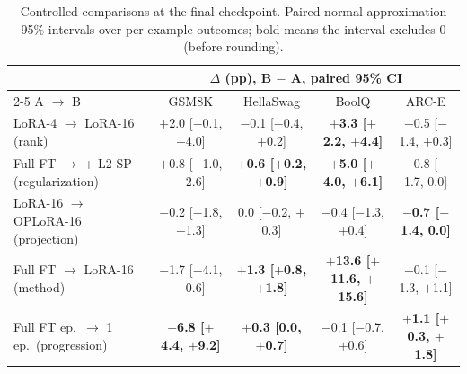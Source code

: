 \begin{table}[t]
\centering
\footnotesize
\setlength{\tabcolsep}{3.0pt}
\caption{Controlled comparisons at the final checkpoint. Paired normal-approximation 95\% intervals over per-example outcomes; bold means the interval excludes 0 (before rounding).}
\label{tab:compare}
\begin{tabular}{lcccc}
\toprule
 & \multicolumn{4}{c}{$\Delta$ (pp), B $-$ A, paired 95\% CI} \\
\cmidrule(lr){2-5}
A $\to$ B & GSM8K & HellaSwag & BoolQ & ARC-E \\
\midrule
LoRA-4 $\to$ LoRA-16 (rank) & $+$2.0 [$-$0.1, $+$4.0] & $-$0.1 [$-$0.4, $+$0.2] & \textbf{$+$3.3 [$+$2.2, $+$4.4]} & $-$0.5 [$-$1.4, $+$0.3] \\
Full FT $\to$ + L2-SP (regularization) & $+$0.8 [$-$1.0, $+$2.6] & \textbf{$+$0.6 [$+$0.2, $+$0.9]} & \textbf{$+$5.0 [$+$4.0, $+$6.1]} & $-$0.8 [$-$1.7, 0.0] \\
LoRA-16 $\to$ OPLoRA-16 (projection) & $-$0.2 [$-$1.8, $+$1.3] & 0.0 [$-$0.2, $+$0.3] & $-$0.4 [$-$1.3, $+$0.4] & \textbf{$-$0.7 [$-$1.4, 0.0]} \\
Full FT $\to$ LoRA-16 (method) & $-$1.7 [$-$4.1, $+$0.6] & \textbf{$+$1.3 [$+$0.8, $+$1.8]} & \textbf{$+$13.6 [$+$11.6, $+$15.6]} & $-$0.1 [$-$1.3, $+$1.1] \\
Full FT \textonehalf{} ep.\ $\to$ 1 ep.\ (progression) & \textbf{$+$6.8 [$+$4.4, $+$9.2]} & \textbf{$+$0.3 [0.0, $+$0.7]} & $-$0.1 [$-$0.7, $+$0.6] & \textbf{$+$1.1 [$+$0.3, $+$1.8]} \\
\bottomrule
\end{tabular}
\end{table}
